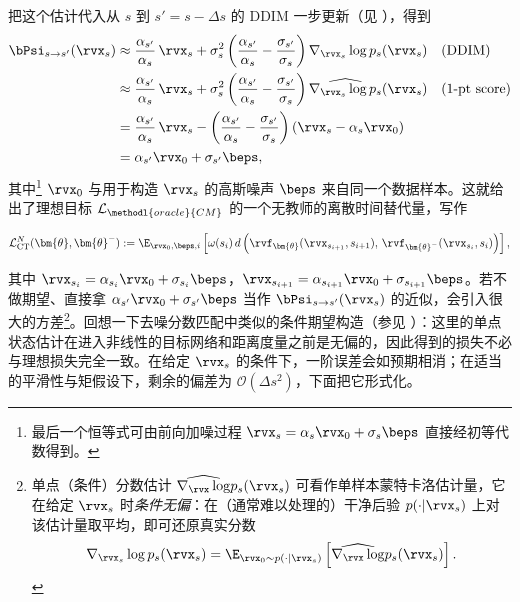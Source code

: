 把这个估计代入从 $s$ 到 $s' = s-\Delta s$ 的 DDIM 一步更新（见 ），得到
\begin{align}\label{eq:one-pt-score}
\begin{aligned}
    \bPsi_{s\to s'}(\rvx_s)
&\approx
\frac{\alpha_{s'}}{\alpha_s}\,\rvx_s
+ \sigma_s^2 \left(\frac{\alpha_{s'}}{\alpha_s}-\frac{\sigma_{s'}}{\sigma_s}\right)\nabla_{\rvx_s}\log p_s(\rvx_s) && \text{(DDIM)}
\\
&\approx
\frac{\alpha_{s'}}{\alpha_s}\,\rvx_s
+ \sigma_s^2 \left(\frac{\alpha_{s'}}{\alpha_s}-\frac{\sigma_{s'}}{\sigma_s}\right)\widehat{\nabla_{\rvx_s}\log p_s}(\rvx_s) && \text{(1-pt score)}
\\
&=
\frac{\alpha_{s'}}{\alpha_s}\,\rvx_s
-\left(\frac{\alpha_{s'}}{\alpha_s}-\frac{\sigma_{s'}}{\sigma_s}\right)(\rvx_s-\alpha_s\rvx_0)
\\
&= \alpha_{s'}\rvx_0+\sigma_{s'}\beps,
\end{aligned}
\end{align}
其中\footnote{最后一个恒等式可由前向加噪过程 $\rvx_s=\alpha_s \rvx_0+\sigma_s \beps$ 直接经初等代数得到。}
$\rvx_0$ 与用于构造 $\rvx_s$ 的高斯噪声 $\beps$ 来自同一个数据样本。这就给出了理想目标 $\mathcal{L}_{\methodl{oracle}{CM}}$ 的一个无教师的离散时间替代量，写作
\begin{mdframed}
\begin{align}\label{eq:ct-discrete-approx-N}
    \mathcal{L}_{\text{CT}}^N(\bm{\theta}, \bm{\theta}^-)
    := \E_{\rvx_0, \beps, i} \left[
       \omega(s_i)\, d \left(\rvf_{\bm{\theta}}(\rvx_{s_{i+1}}, s_{i+1}),\,
       \rvf_{\bm{\theta}^-}(\rvx_{s_i}, s_i)\right)
    \right],
\end{align}
\end{mdframed}
其中 $\rvx_{s_i} = \alpha_{s_i}\rvx_0 + \sigma_{s_i}\beps$，$\rvx_{s_{i+1}} = \alpha_{s_{i+1}}\rvx_0 + \sigma_{s_{i+1}}\beps$。若不做期望、直接拿 $\alpha_{s'}\rvx_0+\sigma_{s'}\beps$ 当作 $\bPsi_{s\to s'}(\rvx_s)$ 的近似，会引入很大的方差\footnote{单点（条件）分数估计 $\widehat{\nabla_{\rvx}\log}p_s(\rvx_s)$ 可看作单样本蒙特卡洛估计量，它在给定 $\rvx_s$ 时\emph{条件无偏}：在（通常难以处理的）干净后验 $p(\cdot|\rvx_s)$ 上对该估计量取平均，即可还原真实分数
\[
\nabla_{\rvx_s}\log p_s(\rvx_s)
= \E_{\rvx_0\sim p(\cdot|\rvx_s)}
 \left[\widehat{\nabla_{\rvx}\log}p_s(\rvx_s)\right].
\]}。回想一下去噪分数匹配中类似的条件期望构造（参见 ）：这里的单点状态估计在进入非线性的目标网络和距离度量之前是无偏的，因此得到的损失不必与理想损失完全一致。在给定 $\rvx_s$ 的条件下，一阶误差会如预期相消；在适当的平滑性与矩假设下，剩余的偏差为
$\mathcal{O}(\Delta s^2)$，下面把它形式化。



